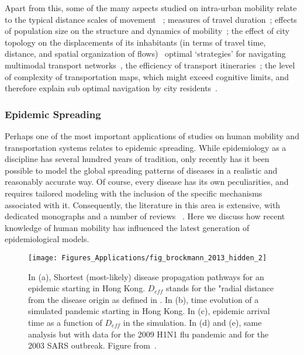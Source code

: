 Apart from this, some of the many aspects studied on intra-urban mobility relate to the typical distance scales of movement ~\cite{bazzani_2010_statistical,gallotti_2015_understanding}; measures of travel duration~\cite{gallotti_2015_understanding}; effects of population size on
the structure and dynamics of mobility~\cite{louf_2014_how,
louail_2015_uncovering}; the effect of city topology on the displacements of its
inhabitants (in terms of travel time, distance, and spatial
organization of flows)~\cite{kang_2012_intra} optimal `strategies' for navigating
multimodal transport networks~\cite{gallotti_2014_anatomy}, the efficiency of transport
itineraries~\cite{lima_2016_understanding}; the level of
complexity of transportation maps, which might exceed cognitive
limits, and therefore explain sub optimal navigation by city residents~\cite{gallotti_2016_lost}.


\subsubsection{Epidemic Spreading}

Perhaps one of the most important applications of studies on human mobility and transportation systems relates to  epidemic spreading. While epidemiology as a discipline has several hundred years of tradition, only recently has it been possible to model the global spreading patterns of diseases in a realistic and reasonably accurate way. Of course, every disease has its own peculiarities, and requires tailored modeling with the inclusion of the specific mechanisms associated with it. Consequently, the literature in this area is extensive, with dedicated monographs and a number of reviews ~\cite{diekmann_2000_mathematical,keeling_2008_modeling,tatem_2014_mapping,pastor-satorras_2015_epidemic}. Here we discuss how recent knowledge of human mobility has influenced the latest generation of epidemiological models.

\begin{figure}
\centering
\texttt{[image: Figures\_Applications/fig\_brockmann\_2013\_hidden\_2]}
\caption{In (a), Shortest (most-likely) disease propagation pathways for an epidemic starting in Hong Kong. $D_{eff}$ stands for the "radial distance from the disease origin as defined in \cite{brockmann_2013_hidden}. In (b), time evolution of a simulated pandemic starting in Hong Kong. In (c), epidemic arrival time as a function of $D_{eff}$ in the simulation. In (d) and (e), same analysis but with data for the 2009 H1N1 flu pandemic and for the 2003 SARS outbreak.  Figure from~\cite{brockmann_2013_hidden}. }
\label{fig:brockmann_2013_hidden_2}
\end{figure}


